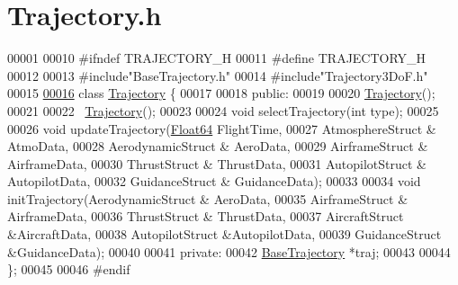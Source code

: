 \hypertarget{_trajectory_8h_source}{}\section{Trajectory.\+h}
\label{_trajectory_8h_source}

\begin{DoxyCode}
00001 
00010 \textcolor{preprocessor}{#ifndef TRAJECTORY\_H}
00011 \textcolor{preprocessor}{#define TRAJECTORY\_H}
00012 
00013 \textcolor{preprocessor}{#include"BaseTrajectory.h"}
00014 \textcolor{preprocessor}{#include"Trajectory3DoF.h"}
00015 
\hyperlink{group___trajectory}{00016} \textcolor{keyword}{class }\hyperlink{group___trajectory_class_trajectory}{Trajectory} \{
00017 
00018 \textcolor{keyword}{public}:
00019 
00020     \hyperlink{group___trajectory_class_trajectory}{Trajectory}();
00021 
00022     ~\hyperlink{group___trajectory_class_trajectory}{Trajectory}();
00023 
00024     \textcolor{keywordtype}{void} selectTrajectory(\textcolor{keywordtype}{int} type);
00025 
00026     \textcolor{keywordtype}{void} updateTrajectory(\hyperlink{group___tools_ga3f1431cb9f76da10f59246d1d743dc2c}{Float64} FlightTime,
00027                         AtmosphereStruct & AtmoData,
00028                         AerodynamicStruct & AeroData,
00029                         AirframeStruct & AirframeData,
00030                         ThrustStruct & ThrustData,
00031                         AutopilotStruct & AutopilotData,
00032                         GuidanceStruct & GuidanceData);
00033 
00034     \textcolor{keywordtype}{void} initTrajectory(AerodynamicStruct & AeroData,
00035                         AirframeStruct & AirframeData,
00036                         ThrustStruct & ThrustData,
00037                         AircraftStruct &AircraftData,
00038                         AutopilotStruct &AutopilotData,
00039                         GuidanceStruct &GuidanceData);
00040 
00041 \textcolor{keyword}{private}:
00042     \hyperlink{group___trajectory_class_base_trajectory}{BaseTrajectory} *traj;
00043 
00044 \};
00045 
00046 \textcolor{preprocessor}{#endif}
\end{DoxyCode}
